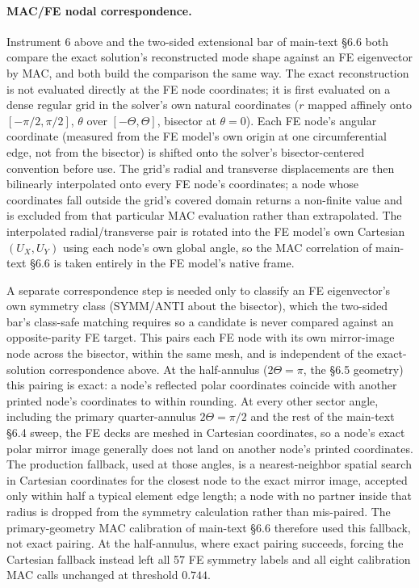 \documentclass[11pt]{article}
\begin{document}
\paragraph{MAC/FE nodal correspondence.} Instrument 6 above and the
two-sided extensional bar of main-text \S6.6 both compare
the exact solution's reconstructed mode shape against an FE eigenvector
by MAC, and both build the comparison the same way. The exact
reconstruction is not evaluated directly at the FE node coordinates; it
is first evaluated on a dense regular grid in the solver's own natural
coordinates ($r$ mapped affinely onto $[-\pi/2,\pi/2]$, $\theta$ over
$[-\Theta,\Theta]$, bisector at $\theta=0$). Each FE node's angular
coordinate (measured from the FE model's own origin at one
circumferential edge, not from the bisector) is shifted onto the
solver's bisector-centered convention before use. The grid's radial and
transverse displacements are then bilinearly interpolated onto every FE
node's coordinates; a node whose coordinates fall outside the grid's
covered domain returns a non-finite value and is excluded from that
particular MAC evaluation rather than extrapolated. The interpolated
radial/transverse pair is rotated into the FE model's own Cartesian
$(U_X,U_Y)$ using each node's own global angle, so the MAC correlation
of main-text \S6.6 is taken entirely in the FE model's native
frame.

A separate correspondence step is needed only to classify an FE
eigenvector's own symmetry class (SYMM/ANTI about the bisector), which
the two-sided bar's class-safe matching requires so a candidate is never
compared against an opposite-parity FE target. This pairs each FE node
with its own mirror-image node across the bisector, within the same
mesh, and is independent of the exact-solution correspondence above. At
the half-annulus ($2\Theta=\pi$, the \S6.5 geometry) this pairing is exact:
a node's reflected polar coordinates coincide with another printed
node's coordinates to within rounding. At every other sector angle,
including the primary quarter-annulus $2\Theta=\pi/2$ and the rest of
the main-text \S6.4 sweep, the FE decks are meshed in Cartesian
coordinates, so a node's exact polar mirror image generally does not
land on another node's printed coordinates. The production fallback,
used at those angles, is a nearest-neighbor spatial search in Cartesian
coordinates for the closest node to the exact mirror image, accepted
only within half a typical element edge length; a node with no partner
inside that radius is dropped from the symmetry calculation rather than
mis-paired. The primary-geometry MAC calibration of main-text \S6.6
therefore used this fallback, not exact pairing. At the half-annulus,
where exact pairing succeeds, forcing the Cartesian fallback instead
left all 57 FE symmetry labels and all eight calibration MAC calls
unchanged at threshold $0.744$.
\end{document}
